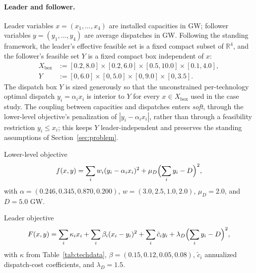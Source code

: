 \documentclass[11pt]{article}
\theoremstyle{definition}
\newcommand{\R}{\mathbb{R}}
\begin{document}
\paragraph{Leader and follower.}
Leader variables $x=(x_1,\ldots,x_4)$ are installed capacities in
GW; follower variables $y=(y_1,\ldots,y_4)$ are average dispatches
in GW. Following the standing framework, the leader's effective
feasible set is a fixed compact subset of $\R^4$, and the
follower's feasible set $Y$ is a fixed compact box independent of
$x$:
\begin{equation}\label{eq:case2-XY}
\begin{aligned}
  X_{\mathrm{box}} &:=[0.2,8.0]\times[0.2,6.0]\times[0.5,10.0]\times[0.1,4.0],\\
  Y &:=[0,6.0]\times[0,5.0]\times[0,9.0]\times[0,3.5].
\end{aligned}
\end{equation}
The dispatch box $Y$ is sized generously so that the
unconstrained per-technology optimal dispatch $y_i=\alpha_i x_i$
is interior to $Y$ for every $x\in X_{\mathrm{box}}$ used in the
case study. The coupling between capacities and dispatches enters
\emph{soft}, through the lower-level objective's penalization of
$|y_i-\alpha_i x_i|$, rather than through a feasibility
restriction $y_i\le x_i$; this keeps $Y$ leader-independent and
preserves the standing assumptions of Section~\ref{sec:problem}.

Lower-level objective
\begin{equation}\label{eq:case2-f}
  f(x,y)=\sum_i w_i(y_i-\alpha_i x_i)^2
  +\mu_D\Bigl(\sum_i y_i-D\Bigr)^2,
\end{equation}
with $\alpha=(0.246,0.345,0.870,0.200)$,
$w=(3.0,2.5,1.0,2.0)$, $\mu_D=2.0$, and $D=5.0$ GW.

Leader objective
\begin{equation}\label{eq:case2-F}
  F(x,y)=\sum_i\kappa_i x_i+\sum_i\beta_i(x_i-y_i)^2
  +\sum_i\tilde c_i y_i+\lambda_D\Bigl(\sum_i y_i-D\Bigr)^2,
\end{equation}
with $\kappa$ from Table~\ref{tab:techdata}, $\beta=(0.15,0.12,0.05,0.08)$,
$\tilde c_i$ annualized dispatch-cost coefficients, and
$\lambda_D=1.5$.
\end{document}
